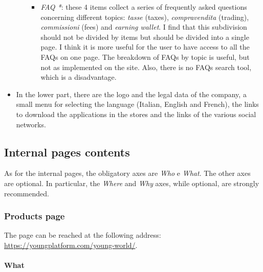 \begin{itemize}
\begin{itemize}
\begin{itemize}
      \item \textit{FAQ *}: these 4 items collect a series of frequently 
      asked questions concerning different topics: \textit{tasse} (taxes), 
      \textit{compravendita} (trading), \textit{commissioni} (fees) and 
      \textit{earning wallet}. I find that this subdivision should not 
      be divided by items but should be divided into a single page. 
      I think it is more useful for the user to have access to all the 
      FAQs on one page. The breakdown of FAQs by topic is useful, but not 
      as implemented on the site. Also, there is no FAQs search tool, 
      which is a disadvantage.
    \end{itemize}
  \end{itemize}

  \item In the lower part, there are the logo and the legal data of the 
  company, a small menu for selecting the language (Italian, English and 
  French), the links to download the applications in the stores and the 
  links of the various social networks.
\end{itemize}

\subsection{Internal pages contents}

As for the internal pages, the obligatory axes are \textit{Who} e 
\textit{What}. The other axes are optional. In particular, the 
\textit{Where} and \textit{Why} axes, while optional, are strongly 
recommended.

\subsubsection{Products page}

The page can be reached at the following address: 
\href{https://youngplatform.com/young-world/}{https://youngplatform.com/young-world/}.

\paragraph{What}

